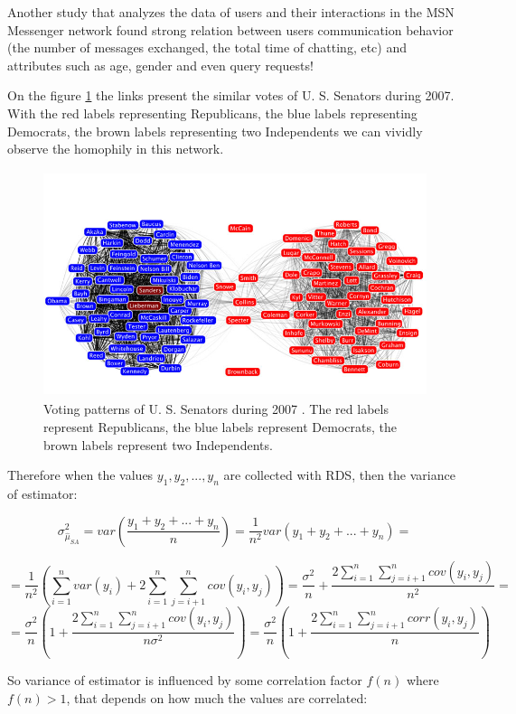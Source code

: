 \documentclass[12pt]{report}
\begin{document}
Another study \cite{singla2008yes} that analyzes the data of users and their interactions in the MSN Messenger network found strong relation between users communication behavior (the number of messages exchanged, the total time of chatting, etc) and attributes such as age, gender and even query requests!

On the figure \ref{fig:senators} the links present the similar votes of U. S. Senators during 2007. With the red labels representing Republicans, the blue labels representing Democrats, the brown labels representing two Independents we can vividly observe the homophily in this network.


\begin{figure}[t]
    \centering
    \includegraphics[height = 250px]{senate}
    \caption{ Voting patterns of U. S. Senators during 2007 \cite{Senate}. The red labels represent Republicans, the blue labels represent Democrats, the brown labels represent two Independents.}
    \label{fig:senators}
\end{figure}

Therefore when the values $y_1, y_2, ..., y_n$ are collected with RDS, then the variance of estimator:

$$ \sigma^2_{\hat{\mu}_{SA}} = var\left( \frac{y_1 + y_2 + ... + y_n}{n}\right)=\frac{1}{n^2} var(y_1 + y_2 + ... + y_n) =$$

$$= \frac{1}{n^2} \left(\sum_{i = 1}^n var(y_i) + 2\sum_{i=1}^n \sum_{j=i+1}^n cov(y_i, y_j)\right)= \frac{\sigma^2}{n} + \frac{2\sum_{i=1}^n \sum_{j=i+1}^n cov(y_i, y_j)}{n^2} = $$
$$ = \frac{\sigma^2}{n} \left(1 + \frac{2\sum_{i=1}^n \sum_{j=i+1}^n cov(y_i, y_j)}{n\sigma^2}\right) = \frac{\sigma^2}{n} \left(1 + \frac{2\sum_{i=1}^n \sum_{j=i+1}^n corr(y_i, y_j)}{n}\right)$$

So variance of estimator is influenced by some correlation factor $f(n)$ where$f(n) > 1$, that depends on how much the values are correlated:
\end{document}
